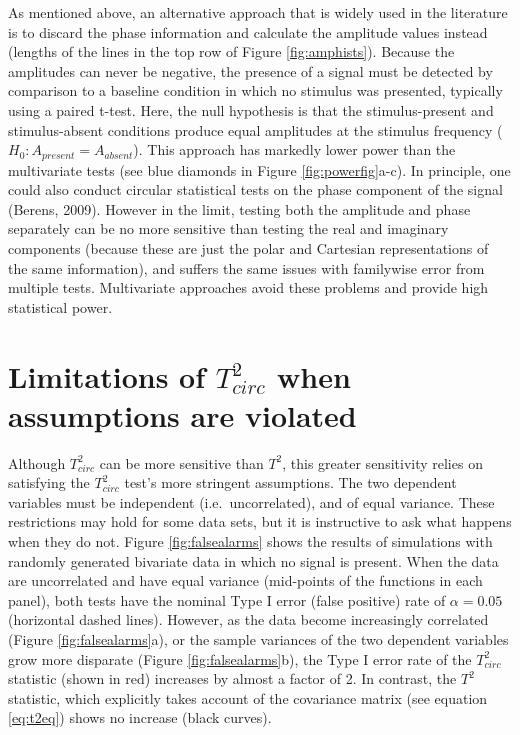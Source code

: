 \documentclass[]{article}
\begin{document}
As mentioned above, an alternative approach that is widely used in the literature is to discard the phase information and calculate the amplitude values instead (lengths of the lines in the top row of Figure \ref{fig:amphists}). Because the amplitudes can never be negative, the presence of a signal must be detected by comparison to a baseline condition in which no stimulus was presented, typically using a paired t-test. Here, the null hypothesis is that the stimulus-present and stimulus-absent conditions produce equal amplitudes at the stimulus frequency (\(H_0: A_{present} = A_{absent}\)). This approach has markedly lower power than the multivariate tests (see blue diamonds in Figure \ref{fig:powerfig}a-c). In principle, one could also conduct circular statistical tests on the phase component of the signal (Berens, 2009). However in the limit, testing both the amplitude and phase separately can be no more sensitive than testing the real and imaginary components (because these are just the polar and Cartesian representations of the same information), and suffers the same issues with familywise error from multiple tests. Multivariate approaches avoid these problems and provide high statistical power.

\hypertarget{limitations-of-t2_circ-when-assumptions-are-violated}{%
\section{\texorpdfstring{Limitations of \(T^2_{circ}\) when assumptions are violated}{Limitations of T\^{}2\_\{circ\} when assumptions are violated}}\label{limitations-of-t2_circ-when-assumptions-are-violated}}

Although \(T^2_{circ}\) can be more sensitive than \(T^2\), this greater sensitivity relies on satisfying the \(T^2_{circ}\) test's more stringent assumptions. The two dependent variables must be independent (i.e.~uncorrelated), and of equal variance. These restrictions may hold for some data sets, but it is instructive to ask what happens when they do not. Figure \ref{fig:falsealarms} shows the results of simulations with randomly generated bivariate data in which no signal is present. When the data are uncorrelated and have equal variance (mid-points of the functions in each panel), both tests have the nominal Type I error (false positive) rate of \(\alpha = 0.05\) (horizontal dashed lines). However, as the data become increasingly correlated (Figure \ref{fig:falsealarms}a), or the sample variances of the two dependent variables grow more disparate (Figure \ref{fig:falsealarms}b), the Type I error rate of the \(T^2_{circ}\) statistic (shown in red) increases by almost a factor of 2. In contrast, the \(T^2\) statistic, which explicitly takes account of the covariance matrix (see equation \eqref{eq:t2eq}) shows no increase (black curves).
\end{document}
